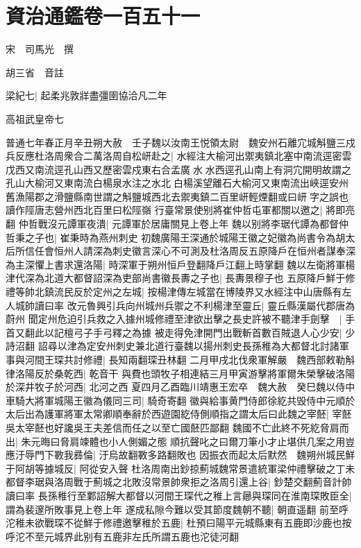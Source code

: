 \chapter{資治通鑑卷一百五十一}
宋　司馬光　撰

胡三省　音註

梁紀七|{
	起柔兆敦牂盡彊圉協洽凡二年}


高祖武皇帝七

普通七年春正月辛丑朔大赦　壬子魏以汝南王悦領太尉　魏安州石離宂城斛鹽三戍兵反應杜洛周衆合二萬洛周自松岍赴之|{
	水經注大榆河出禦夷鎮北塞中南流逕密雲戊西又南流逕孔山西又歷密雲戍東右合孟廣水水西逕孔山南上有洞宂開明故謂之孔山大榆河又東南流白楊泉水注之水北白楊溪望離石大榆河又東南流出峽逕安州舊漁陽郡之滑鹽縣南世謂之斛鹽城西北去禦夷鎮二百里岍輕煙翻或曰岍字之誤也讀作陘唐志營州西北百里曰松陘嶺}
行臺常景使别將崔仲哲屯軍都關以邀之|{
	將即亮翻}
仲哲戰沒元譚軍夜潰|{
	元譚軍於居庸關見上卷上年}
魏以别將李琚代譚為都督仲哲秉之子也|{
	崔秉時為燕州刺史}
初魏廣陽王深通於城陽王徽之妃徽為尚書令為胡太后所信任會恒州人請深為刺史徽言深心不可測及杜洛周反五原降戶在恒州者謀奉深為主深懼上書求還洛陽|{
	時深軍于朔州恒戶登翻降戶江翻上時掌翻}
魏以左衛將軍楊津代深為北道大都督詔深為吏部尚書徽長夀之子也|{
	長夀景穆子也}
五原降戶鮮于修禮等帥北鎮流民反於定州之左城|{
	按楊津傳左城當在博陵界又水經注中山唐縣有左人城帥讀曰率}
改元魯興引兵向州城州兵禦之不利楊津至靈丘|{
	靈丘縣漢屬代郡唐為蔚州}
聞定州危迫引兵救之入據州城修禮至津欲出擊之長史許被不聽津手劍擊　|{
	手首又翻此以記檀弓子手弓釋之為據}
被走得免津開門出戰斬首數百賊退人心少安|{
	少詩沼翻}
詔尋以津為定安州刺史兼北道行臺魏以揚州刺史長孫稚為大都督北討諸軍事與河間王琛共討修禮|{
	長知兩翻琛丑林翻}
二月甲戌北伐衆軍解嚴　魏西部敕勒斛律洛陽反於桑乾西|{
	乾音干}
與費也頭牧子相連結三月甲寅游擊將軍爾朱榮擊破洛陽於深井牧子於河西|{
	北河之西}
夏四月乙酉臨川靖惠王宏卒　魏大赦　癸巳魏以侍中車騎大將軍城陽王徽為儀同三司|{
	騎奇寄翻}
徽與給事黄門侍郎徐紇共毁侍中元順於太后出為護軍將軍太常卿順奉辭於西遊園紇侍側順指之謂太后曰此魏之宰噽|{
	宰噽吳太宰噽也好讒吳王夫差信而任之以至亡國噽匹鄙翻}
魏國不亡此終不死紇脅肩而出|{
	朱元晦曰脅肩竦體也小人側媚之態}
順抗聲叱之曰爾刀筆小才止堪供几案之用豈應汙辱門下斁我彞倫|{
	汙烏故翻斁多路翻敗也}
因振衣而起太后默然　魏朔州城民鮮于阿胡等據城反|{
	阿從安入聲}
杜洛周南出鈔掠薊城魏常景遣統軍梁仲禮擊破之丁未都督李琚與洛周戰于薊城之北敗沒常景帥衆拒之洛周引還上谷|{
	鈔楚交翻薊音計帥讀曰率}
長孫稚行至鄴詔解大都督以河間王琛代之稚上言曏與琛同在淮南琛敗臣全|{
	謂為裴邃所敗事見上卷上年}
遂成私隙今難以受其節度魏朝不聽|{
	朝直遥翻}
前至呼沱稚未欲戰琛不從鮮于修禮邀擊稚於五鹿|{
	杜預曰陽平元城縣東有五鹿即沙鹿也按呼沱不至元城界此别有五鹿非左氏所謂五鹿也沱徒河翻}
